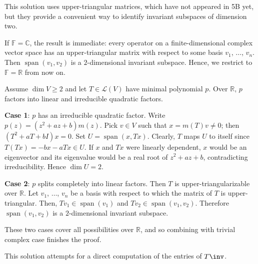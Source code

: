 
This solution uses upper-triangular matrices, which have not appeared in 5B yet, but they provide a convenient way to identify invariant subspaces of dimension two.

\begin{csp}
    If $\mathbb{F}=\mathbb{C}$, the result is immediate: every operator on a finite-dimensional complex vector space has an upper-triangular matrix with respect to some basis $v_1$, $\dots$, $v_n$. Then $\operatorname{span}(v_1,v_2)$ is a $2$-dimensional invariant subspace. Hence, we restrict to $\mathbb{F}=\mathbb{R}$ from now on.

    Assume $\dim V \geq 2$ and let $T \in \mathcal{L}(V)$ have minimal polynomial $p$. Over $\mathbb{R}$, $p$ factors into linear and irreducible quadratic factors.

    \textbf{Case 1}: $p$ has an irreducible quadratic factor. Write $p(z)=(z^2+az+b)m(z)$. Pick $v \in V$ such that $x=m(T)v \neq 0$; then $(T^2+aT+bI)x=0$. Set $U=\operatorname{span}(x,Tx)$. Clearly, $T$ maps $U$ to itself since $T(Tx)=-bx-aTx \in U$. If $x$ and $Tx$ were linearly dependent, $x$ would be an eigenvector and its eigenvalue would be a real root of $z^2+az+b$, contradicting irreducibility. Hence $\dim U=2$.

    \textbf{Case 2}: $p$ splits completely into linear factors. Then $T$ is upper-triangularizable over $\mathbb{R}$. Let $v_1$, $\dots$, $v_n$ be a basis with respect to which the matrix of $T$ is upper-triangular. Then, $Tv_1 \in \operatorname{span}(v_1)$ and $Tv_2 \in \operatorname{span}(v_1, v_2)$. Therefore $\operatorname{span}(v_1,v_2)$ is a $2$-dimensional invariant subspace.

    These two cases cover all possibilities over $\mathbb{R}$, and so combining with trivial complex case finishes the proof.
\end{csp}


This solution attempts for a direct computation of the entries of $T\inv$.

